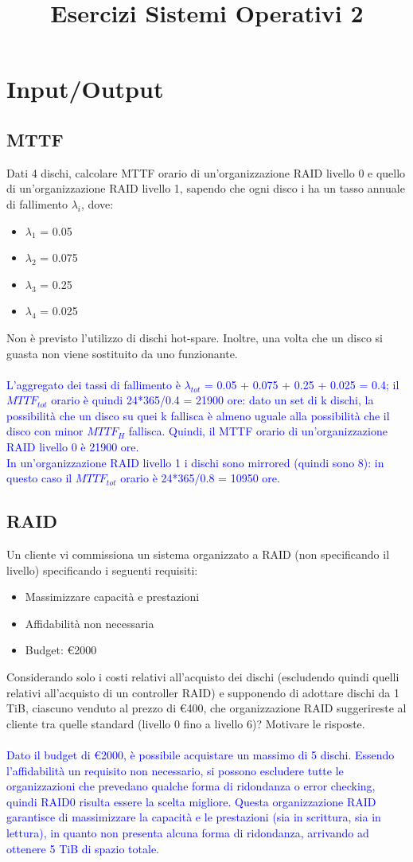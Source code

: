 \documentclass[12pt]{article}
\title{Esercizi Sistemi Operativi 2}
\begin{document}
\tableofcontents
\newpage
{}
\section{Input/Output}
\subsection{MTTF}
Dati 4 dischi, calcolare MTTF orario di un'organizzazione RAID livello 0 e quello di
un'organizzazione RAID livello 1, sapendo che ogni disco i ha un tasso annuale di fallimento $\lambda_i$,
dove:
\begin{itemize}
    \item $\lambda_1$ = 0.05
    \item $\lambda_2$ = 0.075
    \item $\lambda_3$ = 0.25
    \item $\lambda_4$ = 0.025
\end{itemize}
Non è previsto l'utilizzo di dischi hot-spare. Inoltre, una volta che un disco si guasta non viene
sostituito da uno funzionante.\\\\
\textcolor{blue}{L'aggregato dei tassi di fallimento è $\lambda_{tot}$ = 0.05 + 0.075 + 0.25 + 0.025 = 0.4; il $MTTF_{tot}$ orario è quindi 24*365/0.4 = 21900 ore: dato un set di k dischi, 
la possibilità che un disco su quei k fallisca è almeno uguale alla possibilità che il disco con minor $MTTF_H$ fallisca.
Quindi, il MTTF orario di un'organizzazione RAID livello 0 è 21900 ore.\\
In un'organizzazione RAID livello 1 i dischi sono mirrored (quindi sono 8): in questo caso il $MTTF_{tot}$ orario è 24*365/0.8 = 10950 ore.}
\subsection{RAID}
Un cliente vi commissiona un sistema organizzato a RAID (non specificando il livello) specificando i seguenti requisiti:
\begin{itemize}
    \item Massimizzare capacità e prestazioni
    \item Affidabilità non necessaria
    \item Budget: €2000
\end{itemize}
Considerando solo i costi relativi all'acquisto dei dischi (escludendo quindi quelli relativi all'acquisto di un controller RAID) e supponendo di adottare dischi da 1 TiB, ciascuno venduto al
prezzo di €400, che organizzazione RAID suggerireste al cliente tra quelle standard (livello 0 fino a livello 6)? Motivare le risposte.\\\\
\textcolor{blue}{Dato il budget di €2000, è possibile acquistare un massimo di 5 dischi. Essendo l'affidabilità un requisito non necessario, si possono escludere tutte le organizzazioni che prevedano
qualche forma di ridondanza o error checking, quindi RAID0 risulta essere la scelta migliore.
Questa organizzazione RAID garantisce di massimizzare la capacità e le prestazioni (sia in scrittura, sia in lettura), in quanto non presenta alcuna forma di ridondanza, arrivando ad ottenere
5 TiB di spazio totale.}
\end{document}
